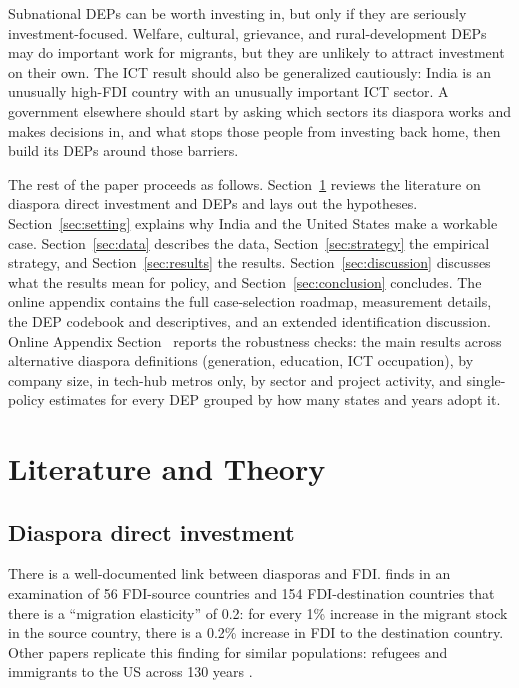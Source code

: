 \documentclass[12pt]{article}
\begin{document}
Subnational DEPs can be worth investing in, but only if they are seriously investment-focused. Welfare, cultural, grievance, and rural-development DEPs may do important work for migrants, but they are unlikely to attract investment on their own. The ICT result should also be generalized cautiously: India is an unusually high-FDI country with an unusually important ICT sector. A government elsewhere should start by asking which sectors its diaspora works and makes decisions in, and what stops those people from investing back home, then build its DEPs around those barriers.

The rest of the paper proceeds as follows. Section~\ref{sec:lit} reviews the literature on diaspora direct investment and DEPs and lays out the hypotheses. Section~\ref{sec:setting} explains why India and the United States make a workable case. Section~\ref{sec:data} describes the data, Section~\ref{sec:strategy} the empirical strategy, and Section~\ref{sec:results} the results. Section~\ref{sec:discussion} discusses what the results mean for policy, and Section~\ref{sec:conclusion} concludes. The online appendix contains the full case-selection roadmap, measurement details, the DEP codebook and descriptives, and an extended identification discussion. Online Appendix Section~ reports the robustness checks: the main results across alternative diaspora definitions (generation, education, ICT occupation), by company size, in tech-hub metros only, by sector and project activity, and single-policy estimates for every DEP grouped by how many states and years adopt it.

\section{Literature and Theory} \label{sec:lit}

\subsection{Diaspora direct investment}

There is a well-documented link between diasporas and FDI. \citet{leblang_familiarity_2010} finds in an examination of 56 FDI-source countries and 154 FDI-destination countries that there is a ``migration elasticity'' of 0.2: for every 1\% increase in the migrant stock in the source country, there is a 0.2\% increase in FDI to the destination country. Other papers replicate this finding for similar populations: refugees and immigrants to the US across 130 years \citep{mayda_refugees_2022, burchardi_migrants_2019}.
\end{document}
